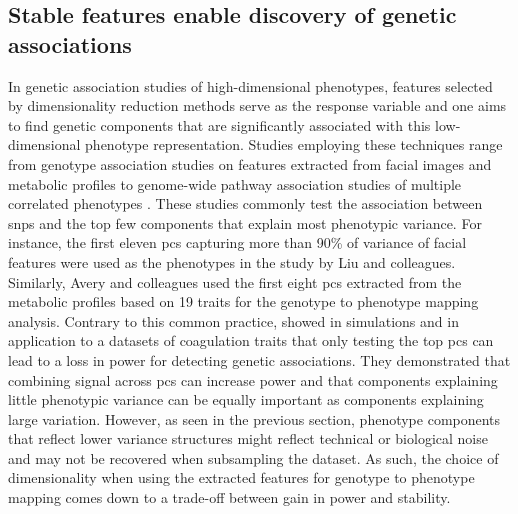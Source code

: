 \subsection{Stable features enable discovery of genetic associations}
\label{subsection:association-DimRed}
In genetic association studies of high-dimensional phenotypes, features selected by dimensionality reduction methods serve as the response variable and one aims to find genetic components that are significantly associated with this low-dimensional phenotype representation. Studies employing these techniques range from genotype association studies on features extracted from facial images \citep{Liu2012} and metabolic profiles \citep{Avery2011} to genome-wide pathway association studies of multiple correlated phenotypes \citep{Zhang2012}. These studies commonly test the association between \glspl{snp} and the top few components that explain most phenotypic variance. For instance,  the first eleven \glspl{pc} capturing more than \num{90}\% of variance of facial features were used as the phenotypes in the study by Liu and colleagues. Similarly, Avery and colleagues used the first eight \glspl{pc} extracted from the metabolic profiles based on \num{19} traits for the genotype to phenotype mapping analysis. Contrary to this common practice, \citet{Aschard2014} showed in simulations and in application to a datasets of coagulation traits that only testing the top \glspl{pc} can lead to a loss in power for detecting genetic associations. They demonstrated that combining signal across \glspl{pc} can increase power and that components explaining little phenotypic variance can be equally important as components explaining large variation. However, as seen in the previous section, phenotype components that reflect lower variance structures might reflect technical or biological noise and may not be recovered when subsampling the dataset. As such, the choice of dimensionality when using the extracted features for genotype to phenotype mapping comes down to a trade-off between gain in power and stability.


